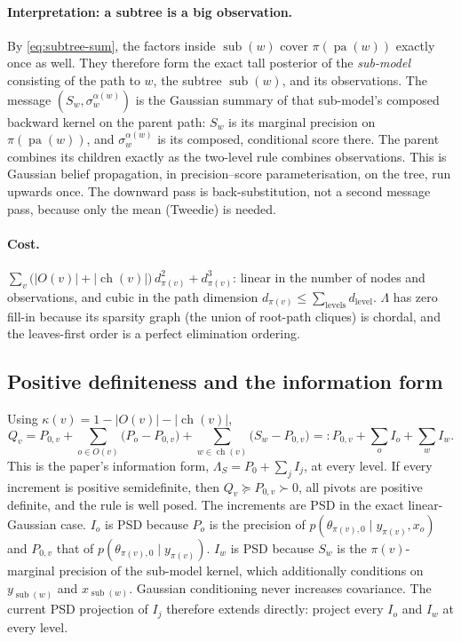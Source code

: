 \documentclass[11pt]{article}
\theoremstyle{definition}
\theoremstyle{remark}
\newcommand{\pa}{\operatorname{pa}}
\newcommand{\ch}{\operatorname{ch}}
\newcommand{\sub}{\operatorname{sub}}
\begin{document}
\paragraph{Interpretation: a subtree is a big observation.}
By \eqref{eq:subtree-sum}, the factors inside $\sub(w)$ cover $\pi(\pa(w))$
exactly once as well. They therefore form the exact tall posterior of the
\emph{sub-model} consisting of the path to $w$, the subtree $\sub(w)$, and its
observations. The message $(S_w,\sigma_w^{\alpha(w)})$ is the Gaussian summary of
that sub-model's composed backward kernel on the parent path: $S_w$ is its
marginal precision on $\pi(\pa(w))$, and $\sigma_w^{\alpha(w)}$ is its composed,
conditional score there. The parent combines its children exactly as the
two-level rule combines observations. This is Gaussian belief propagation, in
precision--score parameterisation, on the tree, run upwards once. The downward
pass is back-substitution, not a second message pass, because only the mean
(Tweedie) is needed.

\paragraph{Cost.} $\sum_v\big(|O(v)|+|\ch(v)|\big)\,d_{\pi(v)}^2+d_{\pi(v)}^3$:
linear in the number of nodes and observations, and cubic in the path dimension
$d_{\pi(v)}\le\sum_{\text{levels}}d_\text{level}$. $\Lambda$ has zero fill-in
because its sparsity graph (the union of root-path cliques) is chordal, and the
leaves-first order is a perfect elimination ordering.

\subsection{Positive definiteness and the information form}
Using $\kappa(v)=1-|O(v)|-|\ch(v)|$,
\begin{equation}\label{eq:tree-info}
Q_v=P_{0,v}+\sum_{o\in O(v)}\big(P_o-P_{0,v}\big)+\sum_{w\in\ch(v)}\big(S_w-P_{0,v}\big)
=:P_{0,v}+\sum_{o}I_o+\sum_wI_w .
\end{equation}
This is the paper's information form, $\Lambda_S=P_0+\sum_jI_j$, at every
level. If every increment is positive semidefinite, then $Q_v\succeq P_{0,v}\succ0$,
all pivots are positive definite, and the rule is well posed. The increments are
PSD in the exact linear-Gaussian case. $I_o$ is PSD because $P_o$ is the precision
of $p(\theta_{\pi(v),0}\mid y_{\pi(v)},x_o)$ and $P_{0,v}$ that of
$p(\theta_{\pi(v),0}\mid y_{\pi(v)})$. $I_w$ is PSD because $S_w$ is the
$\pi(v)$-marginal precision of the sub-model kernel, which additionally
conditions on $y_{\sub(w)}$ and $x_{\sub(w)}$. Gaussian conditioning never
increases covariance. The current PSD projection of $I_j$ therefore extends
directly: project every $I_o$ and $I_w$ at every level.
\end{document}
